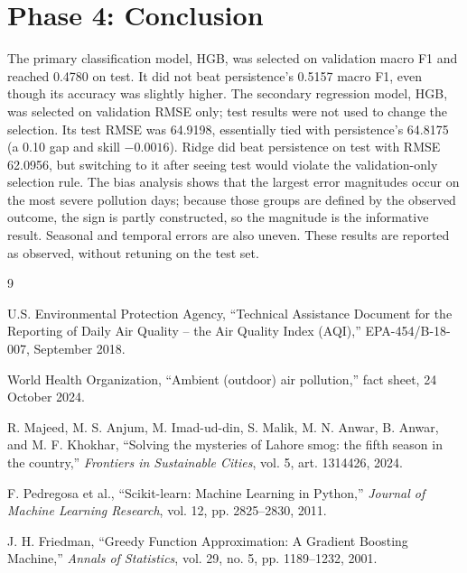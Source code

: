 \documentclass[11pt]{article}
\begin{document}


\section{Phase 4: Conclusion}

The primary classification model, HGB, was selected on validation macro F1 and reached 0.4780 on test. It did not beat persistence's 0.5157 macro F1, even though its accuracy was slightly higher. The secondary regression model, HGB, was selected on validation RMSE only; test results were not used to change the selection. Its test RMSE was 64.9198, essentially tied with persistence's 64.8175 (a 0.10 gap and skill $-0.0016$). Ridge did beat persistence on test with RMSE 62.0956, but switching to it after seeing test would violate the validation-only selection rule. The bias analysis shows that the largest error magnitudes occur on the most severe pollution days; because those groups are defined by the observed outcome, the sign is partly constructed, so the magnitude is the informative result. Seasonal and temporal errors are also uneven. These results are reported as observed, without retuning on the test set.

\begin{thebibliography}{9}

U.S. Environmental Protection Agency,
``Technical Assistance Document for the Reporting of Daily Air Quality -- the Air Quality Index (AQI),'' EPA-454/B-18-007, September 2018.

World Health Organization,
``Ambient (outdoor) air pollution,'' fact sheet, 24 October 2024.

R. Majeed, M. S. Anjum, M. Imad-ud-din, S. Malik, M. N. Anwar, B. Anwar, and M. F. Khokhar,
``Solving the mysteries of Lahore smog: the fifth season in the country,''
\emph{Frontiers in Sustainable Cities}, vol. 5, art. 1314426, 2024.

F. Pedregosa et al.,
``Scikit-learn: Machine Learning in Python,''
\emph{Journal of Machine Learning Research}, vol. 12, pp. 2825--2830, 2011.

J. H. Friedman,
``Greedy Function Approximation: A Gradient Boosting Machine,''
\emph{Annals of Statistics}, vol. 29, no. 5, pp. 1189--1232, 2001.

\end{thebibliography}
\end{document}
